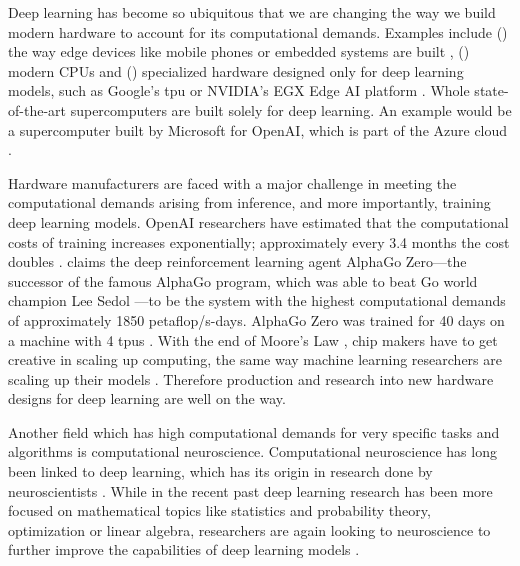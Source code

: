 \documentclass[]{article}
\begin{document}
Deep learning has become so ubiquitous that we are changing the
way we build modern hardware to account for its computational demands.
Examples include () the way edge devices like mobile
phones or embedded systems are built \citep{deng_2019},
() modern CPUs \citep{perez_2017} and ()
specialized hardware designed only for deep learning models, such
as Google's \acrfull{tpu}
\citep{jouppi_et_al_2017} or NVIDIA's EGX Edge AI platform
\citep{boitano_2020}.
Whole state-of-the-art supercomputers are built solely for deep
learning.
An example would be a supercomputer built by Microsoft for OpenAI,
which is part of the Azure cloud \citep{langston_2020}.

Hardware manufacturers are faced with a major challenge in meeting the
computational demands arising from inference, and more importantly,
training deep learning models.
OpenAI researchers have estimated that the computational costs of
training increases exponentially; approximately every 3.4 months the
cost doubles \citep{amodei_et_al_2019}.
\citet{amodei_et_al_2019} claims the deep reinforcement learning agent
AlphaGo Zero---the successor of the famous AlphaGo program, which
was able to beat Go world champion Lee Sedol
\citep{silver_et_al_2017}---to be the system  with the highest
computational demands of approximately 1850 petaflop/s-days.
AlphaGo Zero was trained for 40 days on a machine with 4
\acrshort{tpu}s \citep{silver_et_al_2017}.
With the end of Moore's Law \citep{loeffler_2018}, chip makers have to
get creative in scaling up computing, the same way machine learning
researchers are scaling up their models \citep{simonite_2016}.
Therefore production and research into new hardware designs for deep
learning are well on the way.

Another field which has high computational demands for very specific
tasks and algorithms is computational neuroscience.
Computational neuroscience has long been linked to deep learning,
which has its origin in research done by neuroscientists
\citep{goodfellow_et_al_2016, mcculloch_et_al_1943}.
While in the recent past deep learning research has been more focused
on mathematical topics like statistics and probability theory,
optimization or linear algebra, researchers are again looking to
neuroscience to further improve the capabilities of deep
learning models \citep{marblestone_et_al_2016}.
\end{document}
